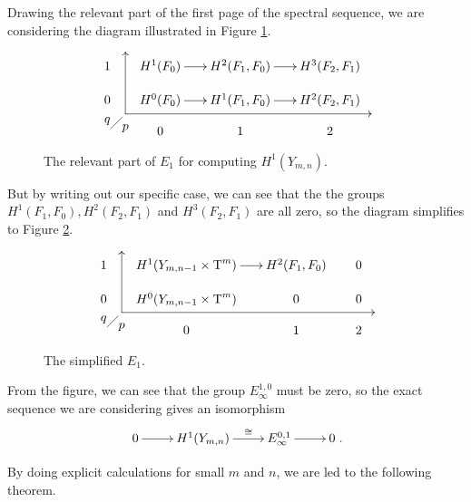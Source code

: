 Drawing the relevant part of the first page of the spectral sequence,
we are considering the diagram illustrated in Figure
\ref{fig:foerste}.
\begin{figure}[ht]
  \[ \xy
  (5,4); (5,-13); **\dir{-}; (5,4); *\dir{>};
  (5,-13); (73,-13); **\dir{-}; *\dir{<};
  (0,-15)*{q}; (5,-17)*{p};
  (1,-17); (4,-14); **\dir{-};
  (0,0)\xymatrix@R=1em@C=1.7em{
    1 & H^1(F_0) \ar[r]& H^2(F_1,F_0) \ar[r] & H^3(F_2,F_1) \\
    0 & H^0(F_0) \ar[r] & H^1(F_1,F_0) \ar[r] & H^2(F_2,F_1) \\
    & 0 & 1 & 2
  } \endxy \]
  \caption{The relevant part of $E_1$ for computing $H^1(Y_{m,n})$.}
  \label{fig:foerste}
\end{figure}
But by writing out our specific case, we can see that the the groups
$H^1(F_1,F_0), H^2(F_2,F_1)$ and $H^3(F_2,F_1)$ are all zero, so the
diagram simplifies to Figure \ref{fig:anden}. 
\begin{figure}[ht]
  \[ \xy
  (5,4); (5,-13); **\dir{-}; (5,4); *\dir{>};
  (5,-13); (75,-13); **\dir{-}; *\dir{<};
  (0,-15)*{q}; (5,-17)*{p};
  (1,-17); (4,-14); **\dir{-};
  (0,0)\xymatrix@R=1em@C=1.7em{
    1 & H^1(Y_{m,n-1}\times \T^m) \ar[r]& H^2(F_1,F_0) & 0 \\
    0 & H^0(Y_{m,n-1}\times \T^{m}) & 0 & 0 \\
    & 0 & 1 & 2
  } \endxy \]
  \caption{The simplified $E_1$.}
  \label{fig:anden}
\end{figure}
From the figure, we can see that the group $E_\infty^{1,0}$
must be zero, so the exact sequence we are considering gives an
isomorphism
\[ \xymatrix{0 \ar[r] & H^1(Y_{m,n}) \ar[r]^>>>>>{\cong} & E^{0,1}_\infty
  \ar[r] & 0}. \]

By doing explicit calculations for small $m$ and $n$, we are led to
the following theorem. 

